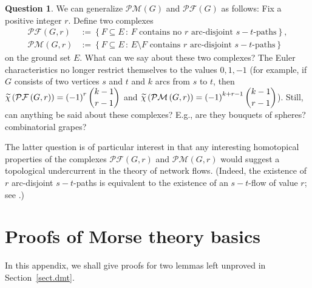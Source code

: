 \documentclass[12pt]{amsart}
\theoremstyle{definition}
\newtheorem{question}[theorem]{Question}
\newcommand{\with}{\,\colon\,}
\newcommand{\set}[1]{\left\{ #1 \right\}}
\newcommand{\tup}[1]{\left( #1 \right)}
\newcommand{\chitil}{\widetilde{\chi}}
\newcommand{\Pm}[1]{\mathcal{PM}\left(#1\right)}
\newcommand{\Pf}[1]{\mathcal{PF}\left(#1\right)}
\begin{document}
\begin{question}
We can generalize $\Pm{G}$ and $\Pf{G}$ as follows:
Fix a positive integer $r$.
Define two complexes
    \begin{align*}
        \Pf{G, r} &:= \set{ F \subseteq E \with F \text{ contains no $r$ arc-disjoint $s-t$-paths}} , \\
        \Pm{G, r} &:= \set{ F \subseteq E \with E\setminus F \text{ contains $r$ arc-disjoint $s-t$-paths}}
    \end{align*}
on the ground set $E$.
What can we say about these two complexes?
The Euler characteristics no longer restrict themselves to the values $0, 1, -1$
(for example, if $G$ consists of two vertices $s$ and $t$ and $k$ arcs from $s$ to $t$,
then $\chitil\tup{\Pf{G, r}} = \tup{-1}^r \dbinom{k-1}{r-1}$
and  $\chitil\tup{\Pm{G, r}} = \tup{-1}^{k+r-1} \dbinom{k-1}{r-1}$).
Still, can anything be said about these complexes?  E.g., are they bouquets of spheres? combinatorial grapes?
\end{question}

The latter question is of particular interest in that
any interesting homotopical properties of the complexes
$\Pf{G, r}$ and $\Pm{G, r}$ would suggest a topological
undercurrent in the theory of network flows.
(Indeed, the existence of $r$ arc-disjoint $s-t$-paths
is equivalent to the existence of an $s-t$-flow of
value $r$; see \cite[Theorem 4.2 and paragraph thereafter]{ForFul62}.)

\appendix


\section{\label{sect.apx-morse}Proofs of Morse theory basics}

In this appendix, we shall give proofs for two lemmas left unproved
in Section~\ref{sect.dmt}.
\end{document}
